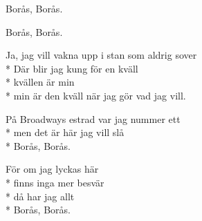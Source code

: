 \begin{SongText}
\begin{SongVerse}
        Borås, Borås.
    \end{SongVerse}
    \begin{SongVerse}
        Borås, Borås.
    \end{SongVerse}
    \begin{SongVerse}
        Ja, jag vill vakna upp i stan som aldrig sover\\*%
        Där blir jag kung för en kväll\\*%
        kvällen är min\\*%
        min är den kväll när jag gör vad jag vill.
    \end{SongVerse}
    \begin{SongVerse}
        På Broadways estrad var jag nummer ett\\*%
        men det är här jag vill slå\\*%
        Borås, Borås.
    \end{SongVerse}
    \begin{SongVerse}
        För om jag lyckas här\\*%
        finns inga mer besvär\\*%
        då har jag allt\\*%
        Borås, Borås.
    \end{SongVerse}
\end{SongText}
